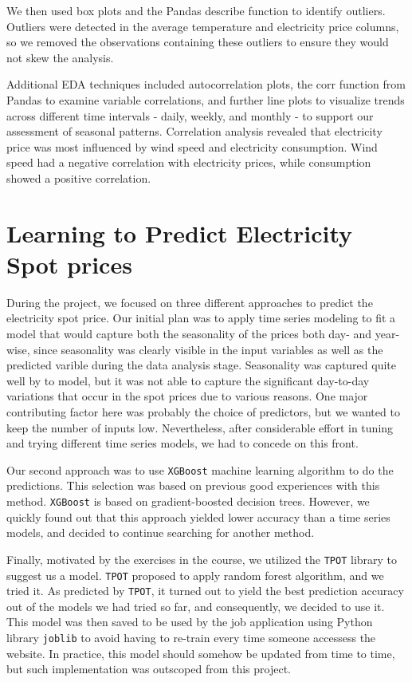 \documentclass{article}
\numberwithin{equation}{section}
\begin{document}
We then used box plots and the Pandas describe function to identify outliers. Outliers were detected in the average temperature and electricity price columns, so we removed the observations containing these outliers to ensure they would not skew the analysis.

Additional EDA techniques included autocorrelation plots, the corr function from Pandas to examine variable correlations, and further line plots to visualize trends across different time intervals - daily, weekly, and monthly - to support our assessment of seasonal patterns. Correlation analysis revealed that electricity price was most influenced by wind speed and electricity consumption. Wind speed had a negative correlation with electricity prices, while consumption showed a positive correlation.

\section{Learning to Predict Electricity Spot prices}
During the project, we focused on three different approaches to predict the electricity spot price. Our initial plan was to apply time series modeling to fit a model that would capture both the seasonality of the prices both day- and year-wise, since seasonality was clearly visible in the input variables as well as the predicted varible during the data analysis stage. Seasonality was captured quite well by to model, but it was not able to capture the significant day-to-day variations that occur in the spot prices due to various reasons. One major contributing factor here was probably the choice of predictors, but we wanted to keep the number of inputs low. Nevertheless, after considerable effort in tuning and trying different time series models, we had to concede on this front.

Our second approach was to use \verb|XGBoost| machine learning algorithm to do the predictions. This selection was based on previous good experiences with this method. \verb|XGBoost| is based on gradient-boosted decision trees. However, we quickly found out that this approach yielded lower accuracy than a time series models, and decided to continue searching for another method.

Finally, motivated by the exercises in the course, we utilized the \verb|TPOT| library to suggest us a model. \verb|TPOT| proposed to apply random forest algorithm, and we tried it. As predicted by \verb|TPOT|, it turned out to yield the best prediction accuracy out of the models we had tried so far, and consequently, we decided to use it. This model was then saved to be used by the job application using Python library \verb|joblib| to avoid having to re-train every time someone accessess the website. In practice, this model should somehow be updated from time to time, but such implementation was outscoped from this project.
\end{document}
